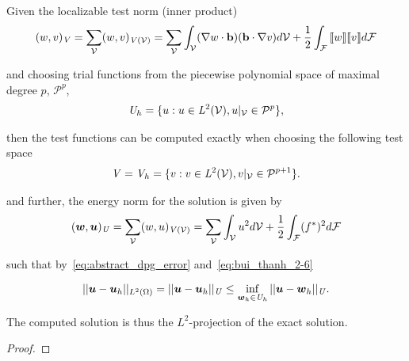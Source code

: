 \begin{proposition} \label{prop:test_norm_for_characteristic_test}
Given the localizable test norm (inner product)
\begin{align}
(w,v)_{\fspace{V}} 
=
\sum_{\fe{V}}
(w,v)_{\fspace{V}(\fe{V})}
= 
\sum_{\fe{V}}
\int_{\fe{V}} (\nabla w \cdot \vect{b})(\vect{b} \cdot \nabla v) d\fe{V}
+
\frac{1}{2} \int_{\fe{F}} \jump{w} \jump{v} d\fe{F}
\end{align}

and choosing trial functions from the piecewise polynomial space of maximal degree $p$, $\mathcal{P}^p$,
\begin{align}
\mathit{{{U}}}_h = \{ u : u \in \mathit{{{L}}}^2(\mathcal{{{V}}}), u|_{\mathcal{{{V}}}} \in \mathcal{P}^p \},
\end{align}

then the test functions can be computed exactly when choosing the following test space
\begin{align}
\mathit{{{V}}} = \mathit{{{V}}}_h = \{ v : v \in \mathit{{{L}}}^2(\mathcal{{{V}}}), v|_{\mathcal{{{V}}}} \in \mathcal{P}^{p+1} \}.
\end{align}

and further, the energy norm for the solution is given by
\begin{align}
(\mathit{\bm{{w}}},\mathit{\bm{{u}}})_{\mathit{{{U}}}} 
=
\sum_{\mathcal{{{V}}}}
(w,u)_{\mathit{{{V}}}(\mathcal{{{V}}})}
= 
\sum_{\mathcal{{{V}}}}
\int_{\mathcal{{{V}}}} u^2 d\mathcal{{{V}}}
+
\frac{1}{2} \int_{\mathcal{{{F}}}} (f^*)^2 d\mathcal{{{F}}}
\end{align}

such that by~\eqref{eq:abstract_dpg_error} and~\eqref{eq:bui_thanh_2-6} 

\begin{align}
||\mathit{\bm{{u}}}-\mathit{\bm{{u}}}_h||_{L^2(\Omega)}
=
||\mathit{\bm{{u}}}-\mathit{\bm{{u}}}_h||_{\mathit{{{U}}}}
\le
\inf_{\mathit{\bm{{w}}}_h \in \mathit{{{U}}}_h} ||\mathit{\bm{{u}}}-\mathit{\bm{{w}}}_h||_{\mathit{{{U}}}}.
\end{align}

The computed solution is thus the $L^2$-projection of the exact solution.

\end{proposition}

\begin{proof}


\end{proof}

